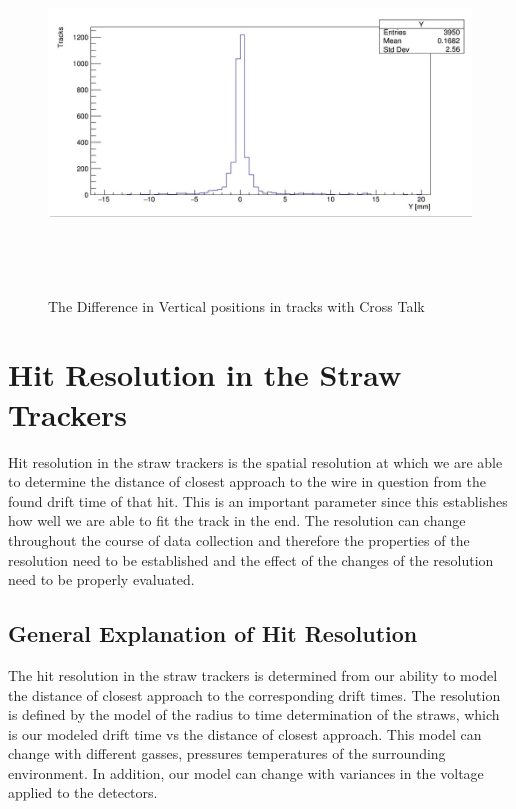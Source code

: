 \documentclass[./Thesis]{subfiles}
\begin{document}
\begin{figure}
	\centerline{\includegraphics[height=95mm]{YDiffXtalk.jpeg}}
	\caption[Difference in Y with Xtalk]{ The Difference in Vertical positions in tracks with Cross Talk}
	\label{fig:YDiffXtalk}
\end{figure}




\section{Hit Resolution in the Straw Trackers}
	Hit resolution in the straw trackers is the spatial resolution at which we are able to determine the distance of closest approach to the wire in question from the found drift time of that hit. This is an important parameter since this establishes how well we are able to fit the track in the end.  The resolution can change throughout the course of data collection and therefore the properties of the resolution need to be established and the effect of the changes of the resolution need to be properly evaluated.

\subsection{General Explanation of Hit Resolution}

	The hit resolution in the straw trackers is determined from our ability to model the distance of closest approach to the corresponding drift times. The resolution is defined by the model of the radius to time determination of the straws, which is our modeled drift time vs the distance of closest approach. This model can change with different gasses, pressures temperatures of the surrounding environment. In addition, our model can change with variances in the voltage applied to the detectors.
\end{document}
